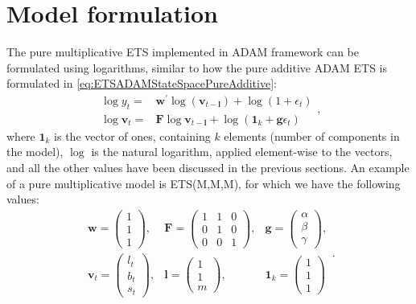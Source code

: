 \documentclass[]{book}
\theoremstyle{definition}
\theoremstyle{definition}
\theoremstyle{definition}
\theoremstyle{definition}
\theoremstyle{remark}
\begin{document}
\hypertarget{ADAMETSPureMultiplicative}{%
\section{Model formulation}\label{ADAMETSPureMultiplicative}}

The pure multiplicative ETS implemented in ADAM framework can be formulated using logarithms, similar to how the pure additive ADAM ETS is formulated in \eqref{eq:ETSADAMStateSpacePureAdditive}:
\begin{equation}
  \begin{aligned}
        \log y_t = & \mathbf{w}^\prime \log(\mathbf{v}_{t-\mathbf{l}}) + \log(1 + \epsilon_{t}) \\
        \log \mathbf{v}_{t} = & \mathbf{F} \log \mathbf{v}_{t-\mathbf{l}} + \log(\mathbf{1}_k + \mathbf{g} \epsilon_t)
  \end{aligned},
  \label{eq:ETSADAMStateSpacePureMultiplicative}
\end{equation}
where \(\mathbf{1}_k\) is the vector of ones, containing \(k\) elements (number of components in the model), \(\log\) is the natural logarithm, applied element-wise to the vectors, and all the other values have been discussed in the previous sections. An example of a pure multiplicative model is ETS(M,M,M), for which we have the following values:
\begin{equation}
  \begin{aligned}
    \mathbf{w} = \begin{pmatrix} 1 \\ 1 \\ 1 \end{pmatrix}, & \mathbf{F} = \begin{pmatrix} 1 & 1 & 0 \\ 0 & 1 & 0 \\ 0 & 0 & 1 \end{pmatrix}, & \mathbf{g} = \begin{pmatrix} \alpha \\ \beta \\ \gamma \end{pmatrix}, \\
    \mathbf{v}_{t} = \begin{pmatrix} l_t \\ b_t \\ s_t \end{pmatrix}, & \mathbf{l} = \begin{pmatrix} 1 \\ 1 \\ m \end{pmatrix}, & \mathbf{1}_k = \begin{pmatrix} 1 \\ 1 \\ 1 \end{pmatrix}
  \end{aligned}.
  \label{eq:ETSADAMMMMMatrices}
\end{equation}
\end{document}

